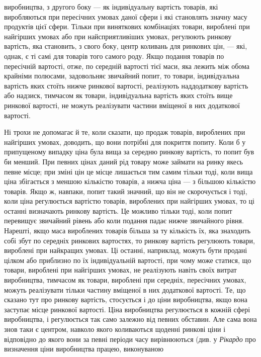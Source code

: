 \parcont{}  %
виробництва, з другого боку — як індивідуальну вартість товарів,
які виробляються при пересічних умовах даної сфери і які становлять
значну масу продуктів цієї сфери. Тільки при виняткових
комбінаціях товари, вироблені при найгірших умовах або
при найсприятливіших умовах, регулюють ринкову вартість, яка становить,
з свого боку, центр коливань для ринкових цін, —
які, однак, є ті самі для товарів того самого роду. Якщо подання
товарів по пересічній вартості, отже, по середній вартості
тієї маси, яка лежить між обома крайніми полюсами,
задовольняє звичайний попит, то товари, індивідуальна вартість
яких стоїть нижче ринкової вартості, реалізують наддодаткову
вартість або надзиск, тимчасом як товари, індивідуальна вартість
яких стоїть вище ринкової вартості, не можуть реалізувати
частини вміщеної в них додаткової вартості.

Ні трохи не допомагає й те, коли сказати, що продаж товарів,
вироблених при найгірших умовах, доводить, що вони
потрібні для покриття попиту.
Коли б у припущеному випадку
ціна була вища за середню ринкову вартість, то попит був би
менший.
При певних цінах даний рід товару може займати
на ринку якесь певне місце; при зміні цін це місце лишається
тим самим тільки тоді, коли вища ціна збігається з меншою
кількістю товарів, а нижча ціна — з більшою кількістю товарів.
Якщо ж, навпаки, попит такий значний, що він не скорочується
і тоді, коли ціна регулюється вартістю товарів, вироблених при
найгірших умовах, то ці останні визначають ринкову вартість.
Це можливо тільки тоді, коли попит перевищує звичайний рівень
або коли подання падає нижче звичайного рівня. Нарешті,
якщо маса вироблених товарів більша за ту кількість їх, яка
знаходить собі збут по середніх ринкових вартостях, то ринкову
вартість регулюють товари, вироблені при найкращих
умовах. Ці останні, наприклад, можуть бути продані цілком або
приблизно по їх індивідуальній вартості, при чому може статися,
що товари, вироблені при найгірших умовах, не реалізують навіть
своїх витрат виробництва, тимчасом як товари, вироблені
при середніх, пересічних умовах, можуть реалізувати тільки частину
вміщеної в них додаткової вартості. Те, що сказано тут
про ринкову вартість, стосується і до ціни виробництва, якщо
вона заступає місце ринкової вартості. Ціна виробництва регулюється
в кожній сфері виробництва, і регулюється так само
залежно від певних обставин. Але сама вона знов таки є центром,
навколо якого коливаються щоденні ринкові ціни і відповідно
до якого вони за певні періоди часу вирівнюються (див.
у \emph{Рікардо} про визначення ціни виробництва працею, виконуваною
\parbreak{}  %
